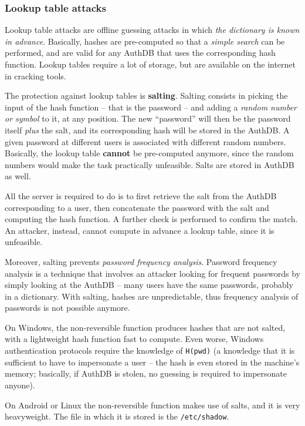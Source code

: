 \documentclass[10pt]{extbook}
\begin{document}
\subsubsection{Lookup table attacks}

Lookup table attacks are offline guessing attacks in which \emph{the dictionary
is known in advance}. Basically, hashes are pre\--computed so that a
\emph{simple search} can be performed, and are valid for any AuthDB that uses
the corresponding hash function. Lookup tables require a lot of storage, but
are available on the internet in cracking tools.

The protection against lookup tables is \textbf{salting}. Salting consists in
picking the input of the hash function -- that is the password -- and adding a
\emph{random number or symbol} to it, at any position. The new ``password''
will then be the password itself \emph{plus} the salt, and its corresponding
hash will be stored in the AuthDB. A given password at different users is
associated with different random numbers. Basically, the lookup table
\textbf{cannot} be pre\--computed anymore, since the random numbers would make
the task practically unfeasible. Salts are stored in AuthDB as well.

All the server is required to do is to first retrieve the salt from the AuthDB
corresponding to a user, then concatenate the password with the salt and
computing the hash function. A further check is performed to confirm the match.
An attacker, instead, cannot compute in advance a lookup table, since it is
unfeasible.

Moreover, salting prevents \emph{password frequency analysis}. Password
frequency analysis is a technique that involves an attacker looking for
frequent passwords by simply looking at the AuthDB -- many users have the same
passwords, probably in a dictionary. With salting, hashes are unpredictable,
thus frequency analysis of passwords is not possible anymore.

On Windows, the non\--reversible function produces hashes that are not salted, with a
lightweight hash function fast to compute. Even worse, Windows authentication
protocols require the knowledge of \texttt{H(pwd)} (a knowledge that it is
sufficient to have to impersonate a user -- the hash is even stored in the
machine's memory; basically, if AuthDB is stolen, no guessing is required to
impersonate anyone).

On Android or Linux the non\--reversible function makes use of salts, and it is
very heavyweight. The file in which it is stored is the \texttt{/etc/shadow}.
\end{document}
